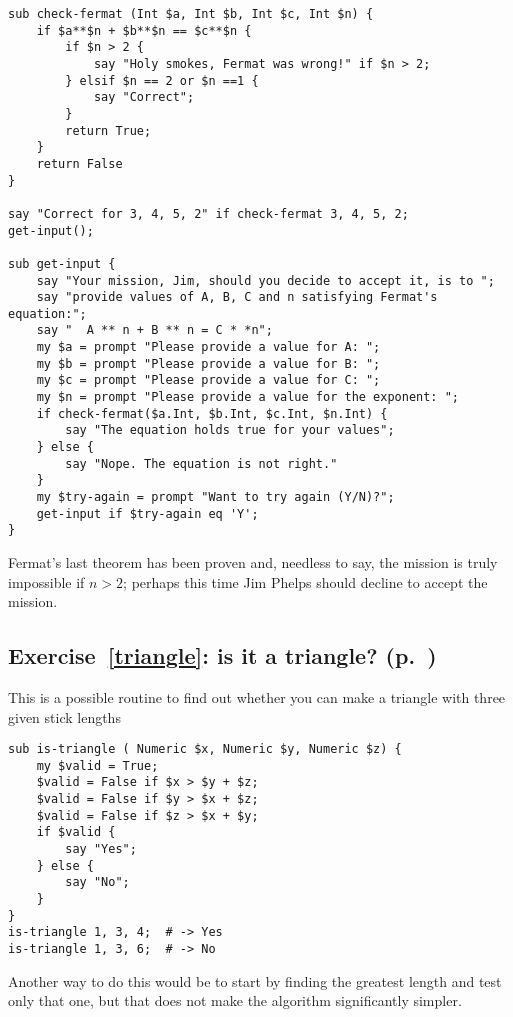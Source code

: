 \begin{verbatim}
sub check-fermat (Int $a, Int $b, Int $c, Int $n) {
    if $a**$n + $b**$n == $c**$n {
        if $n > 2 {
            say "Holy smokes, Fermat was wrong!" if $n > 2;
        } elsif $n == 2 or $n ==1 {
            say "Correct";
        }
        return True; 
    }
    return False
}

say "Correct for 3, 4, 5, 2" if check-fermat 3, 4, 5, 2;
get-input();

sub get-input {
    say "Your mission, Jim, should you decide to accept it, is to ";
    say "provide values of A, B, C and n satisfying Fermat's equation:";
    say "  A ** n + B ** n = C * *n";
    my $a = prompt "Please provide a value for A: ";
    my $b = prompt "Please provide a value for B: ";
    my $c = prompt "Please provide a value for C: ";
    my $n = prompt "Please provide a value for the exponent: ";
    if check-fermat($a.Int, $b.Int, $c.Int, $n.Int) {
        say "The equation holds true for your values";
    } else {
        say "Nope. The equation is not right."
    }
    my $try-again = prompt "Want to try again (Y/N)?";
    get-input if $try-again eq 'Y';
}
\end{verbatim}
%

Fermat's last theorem has been proven and, needless to say, 
the mission is truly impossible if $n > 2$; perhaps this 
time Jim Phelps should decline to accept the mission.

\subsection{Exercise~\ref{triangle}: is it a triangle? (p.~\pageref{triangle})}
\label{sol_triangle}

This is a possible routine to find out whether you can 
make a triangle with three given stick lengths

\begin{verbatim}
sub is-triangle ( Numeric $x, Numeric $y, Numeric $z) {
    my $valid = True;
    $valid = False if $x > $y + $z;
    $valid = False if $y > $x + $z;
    $valid = False if $z > $x + $y;
    if $valid {
        say "Yes"; 
    } else {
        say "No";
    }
}
is-triangle 1, 3, 4;  # -> Yes
is-triangle 1, 3, 6;  # -> No
\end{verbatim}

Another way to do this would be to start by finding the greatest 
length and test only that one, but that does not make the 
algorithm significantly simpler.

